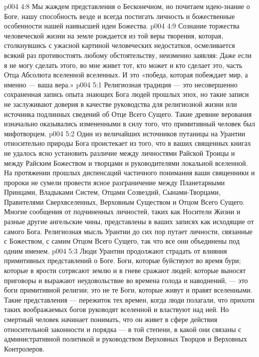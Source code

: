 \vs p004 4:8 Мы жаждем представления о Бесконечном, но почитаем идею\hyp{}знание о Боге, нашу способность везде и всегда постигать личность и божественные особенности нашей наивысшей идеи Божества.
\vs p004 4:9 Сознание торжества человеческой жизни на земле рождается из той веры творения, которая, столкнувшись с ужасной картиной человеческих недостатков, осмеливается всякий раз противостоять любому обстоятельству, неизменно заявляя: Даже если я не могу сделать этого, во мне живет тот, кто может и кто сделает это, часть Отца Абсолюта вселенной вселенных. И это «победа, которая побеждает мир, а именно --- ваша вера.»
\vs p004 5:1 Религиозная традиция --- это несовершенно сохраненная запись опыта знающих Бога людей прошлых эпох, но такие записи не заслуживают доверия в качестве руководства для религиозной жизни или источника подлинных сведений об Отце Всего Сущего. Такие древние верования изначально оказывались измененными в силу того, что примитивный человек был мифотворцем.
\vs p004 5:2 Один из величайших источников путаницы на Урантии относительно природы Бога проистекает из того, что в ваших священных книгах не удалось ясно установить различие между личностями Райской Троицы и между Райским Божеством и творцами и руководителями локальной вселенной. На протяжении прошлых диспенсаций частичного понимания ваши священники и пророки не сумели провести ясное разграничение между Планетарными Принцами, Владыками Систем, Отцами Созвездий, Сынами\hyp{}Творцами, Правителями Сверхвселенных, Верховным Существом и Отцом Всего Сущего. Многие сообщения от подчиненных личностей, таких как Носители Жизни и разные другие ангельские чины, представлены в ваших записях как исходящие от самого Бога. Религиозная мысль Урантии до сих пор путает личности, связанные с Божеством, с самим Отцом Всего Сущего, так что все они объединены под одним именем.
\vs p004 5:3 \pc Люди Урантии продолжают страдать от влияния примитивных представлений о Боге. Боги, которые буйствуют во время бури; которые в ярости сотрясают землю и в гневе сражают людей; которые выносят приговоры и выражают неудовольствие во времена голода и наводнений, --- это боги примитивной религии; это не те Боги, которые живут и правят вселенными. Такие представления --- пережиток тех времен, когда люди полагали, что прихоти таких воображаемых богов руководят вселенной и властвуют над ней. Но смертный человек начинает понимать, что он живет в сфере действия относительной законности и порядка --- в той степени, в какой они связаны с административной политикой и руководством Верховных Творцов и Верховных Контролеров.
